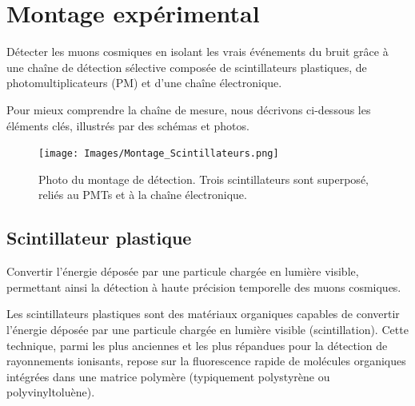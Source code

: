 \documentclass[a4paper,12pt,twoside]{article}
\begin{document}
\newpage

\section{Montage expérimental}


\vspace{1em}
\begin{center}
\begin{tcolorbox}[colback=blue!5!white, colframe=blue!60!black, title=Principe du montage expérimental]
Détecter les muons cosmiques en isolant les vrais événements du bruit grâce à une chaîne de détection sélective composée de scintillateurs plastiques, de photomultiplicateurs (PM) et d’une chaîne électronique.
\end{tcolorbox}
\end{center}

Pour mieux comprendre la chaîne de mesure, nous décrivons ci-dessous les éléments clés, illustrés par des schémas et photos.

\begin{figure}[H]
  \centering
  \texttt{[image: Images/Montage\_Scintillateurs.png]}
  \caption{Photo du montage de détection. Trois scintillateurs sont superposé, reliés au PMTs et à la chaîne électronique.}
  \label{fig:setup}
\end{figure}


\subsection{Scintillateur plastique}



\begin{center}
\begin{tcolorbox}[colback=blue!5!white, colframe=blue!60!black, title=Principe du scintillateur plastique]
Convertir l’énergie déposée par une particule chargée en lumière visible, permettant ainsi la détection à haute précision temporelle des muons cosmiques.
\end{tcolorbox}
\end{center}


Les scintillateurs plastiques sont des matériaux organiques capables de convertir l'énergie déposée par une particule chargée en lumière visible (scintillation). Cette technique, parmi les plus anciennes et les plus répandues pour la détection de rayonnements ionisants, repose sur la fluorescence rapide de molécules organiques intégrées dans une matrice polymère (typiquement polystyrène ou polyvinyltoluène).
\end{document}
